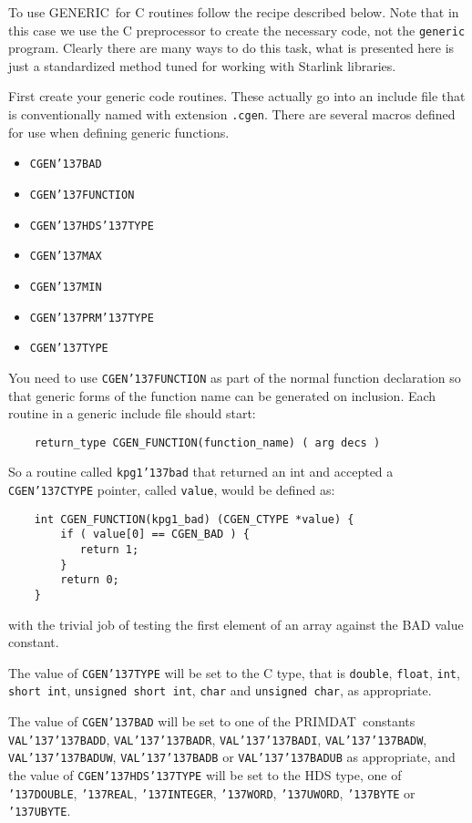 \documentclass[twoside,11pt]{article}
\renewcommand{\_}{{\tt\char'137}}     %
\newcommand{\GENERIC}{{\footnotesize GENERIC}\normalsize}
\newcommand{\PRIMDAT}{{\footnotesize PRIMDAT}\normalsize}
\begin{document}
To use \GENERIC\ for C routines follow the recipe described below. Note that
in this case we use the C preprocessor to create the necessary code, not the
{\tt generic} program. Clearly there are many ways to do this task, what is
presented here is just a standardized method tuned for working with Starlink
libraries.

First create your generic code routines. These actually go into an include
file that is conventionally named with extension {\tt .cgen}. There are several
macros defined for use when defining generic functions.

\begin{itemize}
\item {\tt CGEN\_BAD}
\item {\tt CGEN\_FUNCTION}
\item {\tt CGEN\_HDS\_TYPE}
\item {\tt CGEN\_MAX}
\item {\tt CGEN\_MIN}
\item {\tt CGEN\_PRM\_TYPE}
\item {\tt CGEN\_TYPE}
\end{itemize}

You need to use {\tt CGEN\_FUNCTION} as part of the normal function
declaration so that generic forms of the function name can be generated on
inclusion. Each routine in a generic include file should start:

\begin{verbatim}
    return_type CGEN_FUNCTION(function_name) ( arg decs )
\end{verbatim}

So a routine called {\tt kpg1\_bad} that returned an int and accepted a
{\tt CGEN\_CTYPE} pointer, called {\tt value}, would be defined as:

\begin{verbatim}
    int CGEN_FUNCTION(kpg1_bad) (CGEN_CTYPE *value) {
        if ( value[0] == CGEN_BAD ) {
           return 1;
        }
        return 0;
    }
\end{verbatim}

with the trivial job of testing the first element of an array against the BAD
value constant.

The value of {\tt CGEN\_TYPE} will be set to the C type, that is
{\tt double}, {\tt float}, {\tt int}, {\tt short int},
{\tt unsigned short int}, {\tt char} and {\tt unsigned char}, as
appropriate.

The value of {\tt CGEN\_BAD} will be set to one of the \PRIMDAT\ constants
{\tt VAL\_\_BADD},
{\tt VAL\_\_BADR},
{\tt VAL\_\_BADI},
{\tt VAL\_\_BADW},
{\tt VAL\_\_BADUW},
{\tt VAL\_\_BADB} or
{\tt VAL\_\_BADUB}
as appropriate, and the value of {\tt CGEN\_HDS\_TYPE} will be set to the HDS
type, one of
{\tt \_DOUBLE},
{\tt \_REAL},
{\tt \_INTEGER},
{\tt \_WORD},
{\tt \_UWORD},
{\tt \_BYTE} or
{\tt \_UBYTE}.
\end{document}
